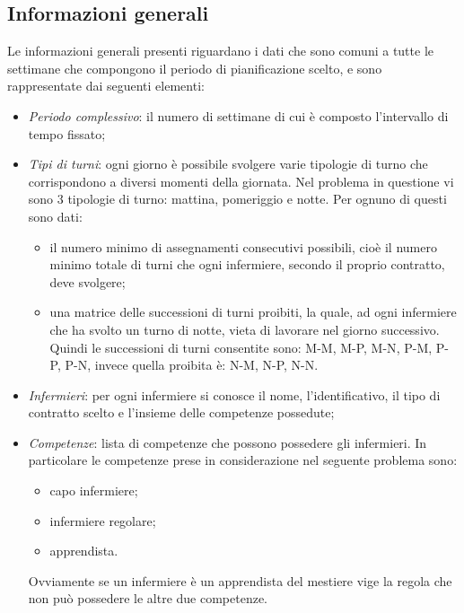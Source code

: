 \subsection{Informazioni generali}
Le informazioni generali presenti riguardano i dati che sono comuni a tutte le settimane che compongono il periodo di pianificazione scelto, e sono rappresentate dai seguenti elementi:
\begin{itemize}

\item \textit{Periodo complessivo}: il numero di settimane di cui è composto l'intervallo di tempo fissato;

\item \textit{Tipi di turni}: ogni giorno è possibile svolgere varie tipologie di turno che corrispondono a diversi momenti della giornata. Nel problema in questione vi sono 3 tipologie di turno: mattina, pomeriggio e notte. Per ognuno di questi sono dati:
\begin{itemize}
\item il numero minimo di assegnamenti consecutivi possibili, cioè il numero minimo totale di turni che ogni infermiere, secondo il proprio contratto, deve svolgere;
\item una matrice delle successioni di turni proibiti, la quale, ad ogni infermiere che ha svolto un turno di notte, vieta di lavorare nel giorno successivo.
Quindi le successioni di turni consentite sono: {M-M, M-P, M-N}, {P-M, P-P, P-N},
invece quella proibita è: {N-M, N-P, N-N}.
\end{itemize}

\item \textit{Infermieri}: per ogni infermiere si conosce il nome, l'identificativo, il tipo di contratto scelto e l'insieme delle competenze possedute;

\item \textit{Competenze}: lista di competenze che possono possedere gli infermieri. In particolare le competenze prese in considerazione nel seguente problema sono:
\begin{itemize}
\item capo infermiere;
\item infermiere regolare;
\item apprendista.
\end{itemize}
Ovviamente se un infermiere è un apprendista del mestiere vige la regola che non può possedere le altre due competenze.


\end{itemize}
